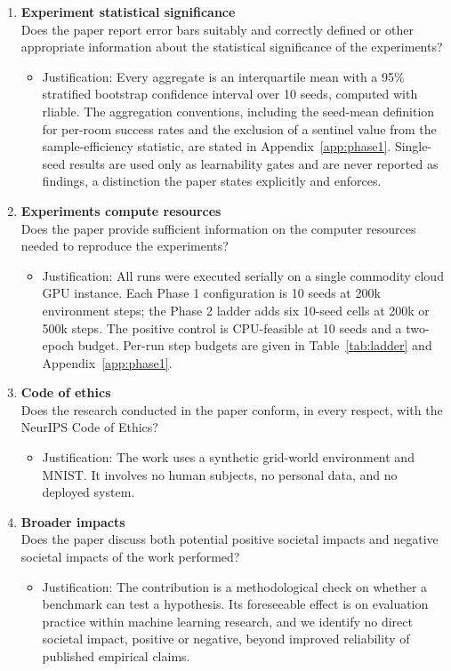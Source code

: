 \begin{enumerate}
\item {\bf Experiment statistical significance}\\
Does the paper report error bars suitably and correctly defined or other appropriate
information about the statistical significance of the experiments?
\answerYes{}
\begin{itemize}
\item[] Justification: Every aggregate is an interquartile mean with a 95\% stratified
  bootstrap confidence interval over 10 seeds, computed with rliable. The aggregation
  conventions, including the seed-mean definition for per-room success rates and the exclusion
  of a sentinel value from the sample-efficiency statistic, are stated in
  Appendix~\ref{app:phase1}. Single-seed results are used only as learnability gates and are
  never reported as findings, a distinction the paper states explicitly and enforces.
\end{itemize}

\item {\bf Experiments compute resources}\\
Does the paper provide sufficient information on the computer resources needed to reproduce
the experiments?
\answerYes{}
\begin{itemize}
\item[] Justification: All runs were executed serially on a single commodity cloud GPU
  instance. Each Phase 1 configuration is 10 seeds at 200k environment steps; the Phase 2
  ladder adds six 10-seed cells at 200k or 500k steps. The positive control is CPU-feasible at
  10 seeds and a two-epoch budget. Per-run step budgets are given in
  Table~\ref{tab:ladder} and Appendix~\ref{app:phase1}.
\end{itemize}

\item {\bf Code of ethics}\\
Does the research conducted in the paper conform, in every respect, with the NeurIPS Code of
Ethics?
\answerYes{}
\begin{itemize}
\item[] Justification: The work uses a synthetic grid-world environment and MNIST. It involves
  no human subjects, no personal data, and no deployed system.
\end{itemize}

\item {\bf Broader impacts}\\
Does the paper discuss both potential positive societal impacts and negative societal impacts
of the work performed?
\answerNA{}
\begin{itemize}
\item[] Justification: The contribution is a methodological check on whether a benchmark can
  test a hypothesis. Its foreseeable effect is on evaluation practice within machine learning
  research, and we identify no direct societal impact, positive or negative, beyond improved
  reliability of published empirical claims.
\end{itemize}


\end{enumerate}
